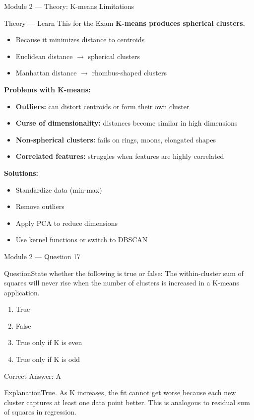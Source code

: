 \documentclass[aspectratio=169,10pt]{beamer}
\newcommand{\question}[1]{\begin{block}{Question}#1\end{block}}
\newcommand{\options}[4]{%
	\begin{enumerate}[label=\Alph*.,leftmargin=*]
		\item #1
		\item #2
		\item #3
		\item #4
	\end{enumerate}
}
\newcommand{\answerbox}[1]{\begin{exampleblock}{Correct Answer: #1}\end{exampleblock}}
\newcommand{\explain}[1]{\begin{block}{Explanation}#1\end{block}}
\newcommand{\theory}[1]{%
	\begin{block}{Theory --- Learn This for the Exam}
		\small #1
	\end{block}
}
\begin{document}
	\begin{frame}{Module 2 --- Theory: K-means Limitations}
		\theory{
			\textbf{K-means produces spherical clusters.}
			\begin{itemize}
				\item Because it minimizes distance to centroids
				\item Euclidean distance $\rightarrow$ spherical clusters
				\item Manhattan distance $\rightarrow$ rhombus-shaped clusters
			\end{itemize}
			\textbf{Problems with K-means:}
			\begin{itemize}
				\item \textbf{Outliers:} can distort centroids or form their own cluster
				\item \textbf{Curse of dimensionality:} distances become similar in high dimensions
				\item \textbf{Non-spherical clusters:} fails on rings, moons, elongated shapes
				\item \textbf{Correlated features:} struggles when features are highly correlated
			\end{itemize}
			\textbf{Solutions:}
			\begin{itemize}
				\item Standardize data (min-max)
				\item Remove outliers
				\item Apply PCA to reduce dimensions
				\item Use kernel functions or switch to DBSCAN
			\end{itemize}
		}
	\end{frame}
	
	\begin{frame}{Module 2 --- Question 17}
		\question{State whether the following is true or false: The within-cluster sum of squares will never rise when the number of clusters is increased in a K-means application.}
		\options{True}{False}{True only if K is even}{True only if K is odd}
		\answerbox{A}
		\explain{True. As K increases, the fit cannot get worse because each new cluster captures at least one data point better. This is analogous to residual sum of squares in regression.}
	\end{frame}
	
\end{document}
